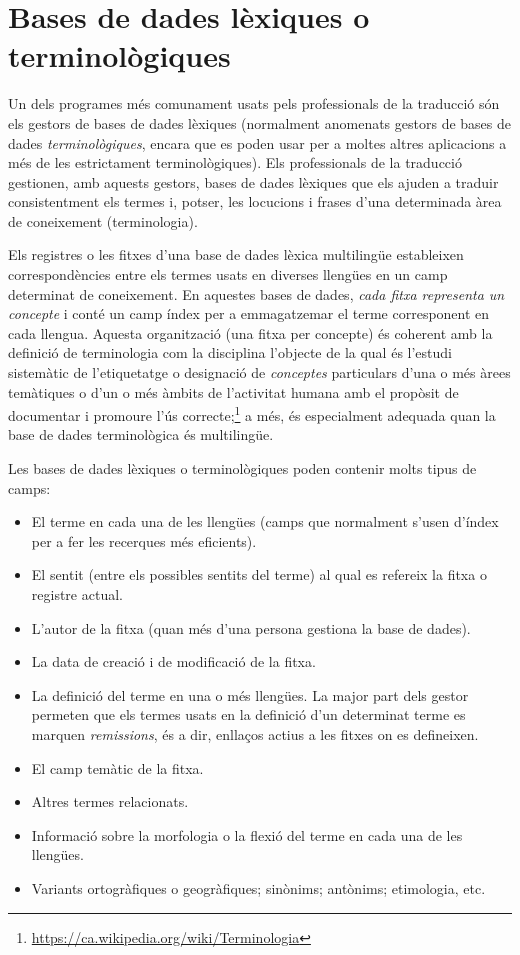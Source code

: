 \section{Bases de dades lèxiques o terminològiques}
\label{ss:bdterm}

Un dels programes més comunament usats pels professionals de la
traducció són els gestors de bases de dades lèxiques (normalment
anomenats gestors de bases de dades \emph{terminològiques}, encara que
es poden usar per a moltes altres aplicacions a més de les
estrictament terminològiques). Els professionals de la traducció
gestionen, amb aquests gestors, bases de dades lèxiques que els ajuden
a traduir consistentment els termes i, potser, les locucions i frases
d'una determinada àrea de coneixement (terminologia).

Els registres o les fitxes d'una base de dades lèxica multilingüe
estableixen correspondències entre els termes usats en diverses
llengües en un camp determinat de coneixement. En aquestes bases de
dades, \emph{cada fitxa representa un concepte} i conté un camp índex
per a emmagatzemar el terme corresponent en cada llengua. Aquesta
organització (una fitxa per concepte) és coherent amb la definició de
terminologia com la disciplina l'objecte de la qual és l'estudi
sistemàtic de l'etiquetatge o designació de \emph{conceptes}
particulars d'una o més àrees temàtiques o d'un o més àmbits de
l'activitat humana amb el propòsit de documentar i promoure l'ús
correcte;\footnote{\url{https://ca.wikipedia.org/wiki/Terminologia}} a
més, és especialment adequada quan la base de dades terminològica és
multilingüe.

Les bases de dades lèxiques o terminològiques poden contenir molts
tipus de camps:
\begin{itemize}
\item El terme en cada una de les llengües (camps que normalment
  s'usen d'índex per a fer les recerques més eficients).
\item El sentit (entre els possibles sentits del terme) al qual es
  refereix la fitxa o registre actual.
\item L'autor de la fitxa (quan més d'una persona gestiona la base de
  dades).
\item La data de creació i de modificació de la fitxa.
\item La definició del terme en una o més llengües. La major part dels
  gestor permeten que els termes usats en la definició d'un determinat
  terme es marquen \emph{remissions}, és a dir, enllaços actius a les
  fitxes on es defineixen.
\item El camp temàtic de la fitxa.
\item Altres termes relacionats.
\item Informació sobre la morfologia o la flexió del terme en cada una
  de les llengües.
\item Variants ortogràfiques o geogràfiques; sinònims; antònims;
  etimologia, etc.
\end{itemize}

